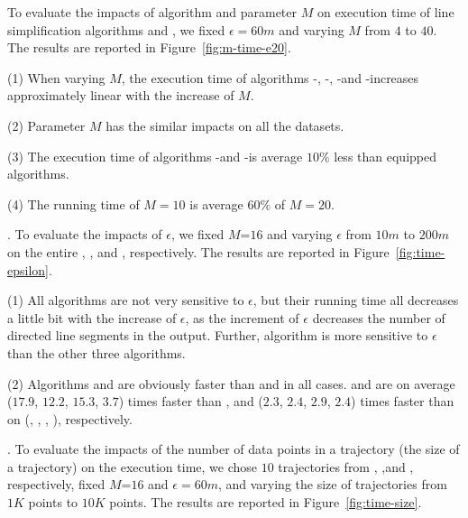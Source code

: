To evaluate the impacts of algorithm \rpia and parameter $M$ on execution time of line simplification algorithms \cist and \cista, we fixed $\epsilon =60m$ and varying $M$ from $4$ to $40$.
%
The results are reported in Figure~\ref{fig:m-time-e20}. %

\ni(1) When varying $M$, the execution time of algorithms \cist-\rpia, \cist-\cpia, \cista-\rpia and \cista-\cpia increases approximately linear with the increase of $M$.

\ni(2) Parameter $M$ has the similar impacts on all the datasets.

\ni(3) The execution time of algorithms \cist-\rpia and \cista-\rpia is average \textcolor[rgb]{1.00,0.00,0.00}{$10\%$} less than \cpia equipped algorithms.

\ni(4) The running time of $M=10$ is average \textcolor[rgb]{1.00,0.00,0.00}{$60\%$} of $M=20$.


.
To evaluate the impacts of $\epsilon$, we fixed \textcolor[rgb]{0.00,0.07,1.00}{$M$=$16$} and varying $\epsilon$  from $10m$ to $200m$ on the entire \truck, \sercar, \geolife and \pricar, respectively.
The results are reported in Figure~\ref{fig:time-epsilon}.

\ni(1) All algorithms are not very sensitive to $\epsilon$, but their running time all decreases a little bit with the increase of $\epsilon$, as the increment of $\epsilon$ decreases the number of directed line segments in the output.
Further, algorithm \dps is more sensitive to $\epsilon$ than the other three algorithms.

\ni\textcolor[rgb]{0.00,0.07,1.00}{{(2)}} Algorithms \cist and \cista are obviously faster than \dps and \squishe in all cases.
\cist and \cista are on average ($17.9$, $12.2$, $15.3$, \textcolor[rgb]{1.00,0.50,0.25}{{$3.7$}}) times faster than \dps, and ($2.3$, $2.4$, $2.9$, {$2.4$}) times faster than \squishe on (\truck, \sercar, {\geolife}, \pricar), respectively.


.
To evaluate the impacts of the number of data points in a trajectory (\ie the size of a trajectory) on the execution time,
we chose {$10$} trajectories from \truck, \sercar,\geolife and \pricar, respectively,
fixed \textcolor[rgb]{0.00,0.07,1.00}{$M$=$16$} and $\epsilon = 60m$, and varying the size  of trajectories from $1K$ points to $10K$ points.
%
The results are reported in Figure~\ref{fig:time-size}.

